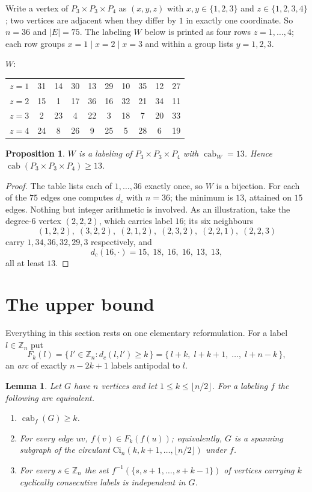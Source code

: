 \documentclass[11pt]{amsart}
\newtheorem{lemma}[theorem]{Lemma}
\newtheorem{proposition}[theorem]{Proposition}
\theoremstyle{remark}
\DeclareMathOperator{\cab}{cab}
\begin{document}
Write a vertex of $P_3\times P_3\times P_4$ as $(x,y,z)$ with $x,y\in\{1,2,3\}$ and
$z\in\{1,2,3,4\}$; two vertices are adjacent when they differ by $1$ in exactly one coordinate.
So $n=36$ and $|E|=75$. The labeling $W$ below is printed as four rows $z=1,\dots,4$; each row
groups $x=1\mid x=2\mid x=3$ and within a group lists $y=1,2,3$.

\begin{center}
$W$:\qquad
\begin{tabular}{r@{\;}|@{\;}ccc@{\;}|@{\;}ccc@{\;}|@{\;}ccc}
 $z=1$ & 31 & 14 & 30 & 13 & 29 & 10 & 35 & 12 & 27\\
 $z=2$ & 15 &  1 & 17 & 36 & 16 & 32 & 21 & 34 & 11\\
 $z=3$ &  2 & 23 &  4 & 22 &  3 & 18 &  7 & 20 & 33\\
 $z=4$ & 24 &  8 & 26 &  9 & 25 &  5 & 28 &  6 & 19
\end{tabular}
\end{center}

\begin{proposition}\label{prop:lower}
$W$ is a labeling of $P_3\times P_3\times P_4$ with $\cab_W=13$. Hence
$\cab(P_3\times P_3\times P_4)\ge13$.
\end{proposition}

\begin{proof}
The table lists each of $1,\dots,36$ exactly once, so $W$ is a bijection. For each of the $75$
edges one computes $d_c$ with $n=36$; the minimum is $13$, attained on $15$ edges. Nothing but
integer arithmetic is involved. As an illustration, take the
degree-$6$ vertex $(2,2,2)$, which carries label $16$; its six neighbours
\[
 (1,2,2),\;(3,2,2),\;(2,1,2),\;(2,3,2),\;(2,2,1),\;(2,2,3)
\]
carry $1,34,36,32,29,3$ respectively, and
\[
 d_c(16,\cdot)=15,\;18,\;16,\;16,\;13,\;13,
\]
all at least $13$.
\end{proof}

\section{The upper bound}\label{sec:upper}

Everything in this section rests on one elementary reformulation. For a label $l\in\mathbb Z_n$
put
\[
 F_k(l)=\{\,l'\in\mathbb Z_n : d_c(l,l')\ge k\,\}
      =\{\,l+k,\;l+k+1,\;\dots,\;l+n-k\,\},
\]
an \emph{arc} of exactly $n-2k+1$ labels antipodal to $l$.

\begin{lemma}\label{lem:window}
Let $G$ have $n$ vertices and let $1\le k\le\lfloor n/2\rfloor$. For a labeling $f$ the following
are equivalent.
\begin{enumerate}
\item[(i)] $\cab_f(G)\ge k$.
\item[(ii)] For every edge $uv$, $f(v)\in F_k(f(u))$; equivalently, $G$ is a spanning subgraph of
      the circulant $\mathrm{Ci}_n(k,k+1,\dots,\lfloor n/2\rfloor)$ under $f$.
\item[(iii)] For every $s\in\mathbb Z_n$ the set $f^{-1}(\{s,s+1,\dots,s+k-1\})$ of vertices
      carrying $k$ cyclically consecutive labels is independent in $G$.
\end{enumerate}
\end{lemma}
\end{document}
